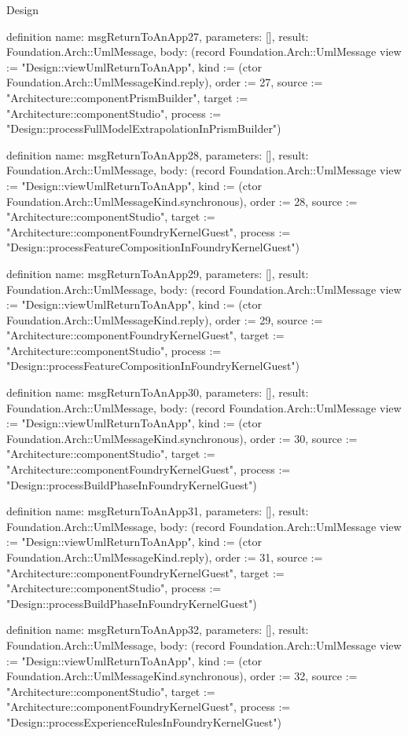\begin{lexlean}{Design}
\begin{semanticmodule}
definition{
  name: msgReturnToAnApp27,
  parameters: [],
  result: Foundation.Arch::UmlMessage,
  body: (record Foundation.Arch::UmlMessage {view := "Design::viewUmlReturnToAnApp", kind := (ctor Foundation.Arch::UmlMessageKind.reply), order := 27, source := "Architecture::componentPrismBuilder", target := "Architecture::componentStudio", process := "Design::processFullModelExtrapolationInPrismBuilder"})
}

definition{
  name: msgReturnToAnApp28,
  parameters: [],
  result: Foundation.Arch::UmlMessage,
  body: (record Foundation.Arch::UmlMessage {view := "Design::viewUmlReturnToAnApp", kind := (ctor Foundation.Arch::UmlMessageKind.synchronous), order := 28, source := "Architecture::componentStudio", target := "Architecture::componentFoundryKernelGuest", process := "Design::processFeatureCompositionInFoundryKernelGuest"})
}

definition{
  name: msgReturnToAnApp29,
  parameters: [],
  result: Foundation.Arch::UmlMessage,
  body: (record Foundation.Arch::UmlMessage {view := "Design::viewUmlReturnToAnApp", kind := (ctor Foundation.Arch::UmlMessageKind.reply), order := 29, source := "Architecture::componentFoundryKernelGuest", target := "Architecture::componentStudio", process := "Design::processFeatureCompositionInFoundryKernelGuest"})
}

definition{
  name: msgReturnToAnApp30,
  parameters: [],
  result: Foundation.Arch::UmlMessage,
  body: (record Foundation.Arch::UmlMessage {view := "Design::viewUmlReturnToAnApp", kind := (ctor Foundation.Arch::UmlMessageKind.synchronous), order := 30, source := "Architecture::componentStudio", target := "Architecture::componentFoundryKernelGuest", process := "Design::processBuildPhaseInFoundryKernelGuest"})
}

definition{
  name: msgReturnToAnApp31,
  parameters: [],
  result: Foundation.Arch::UmlMessage,
  body: (record Foundation.Arch::UmlMessage {view := "Design::viewUmlReturnToAnApp", kind := (ctor Foundation.Arch::UmlMessageKind.reply), order := 31, source := "Architecture::componentFoundryKernelGuest", target := "Architecture::componentStudio", process := "Design::processBuildPhaseInFoundryKernelGuest"})
}

definition{
  name: msgReturnToAnApp32,
  parameters: [],
  result: Foundation.Arch::UmlMessage,
  body: (record Foundation.Arch::UmlMessage {view := "Design::viewUmlReturnToAnApp", kind := (ctor Foundation.Arch::UmlMessageKind.synchronous), order := 32, source := "Architecture::componentStudio", target := "Architecture::componentFoundryKernelGuest", process := "Design::processExperienceRulesInFoundryKernelGuest"})
}


\end{semanticmodule}
\end{lexlean}
